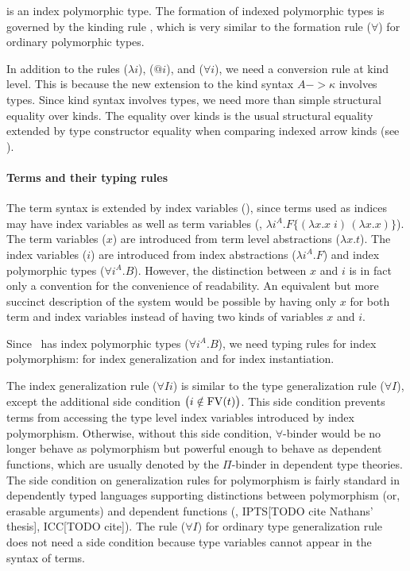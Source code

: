  is an index polymorphic type.
The formation of indexed polymorphic types is governed by
the kinding rule , which is very similar to
the formation rule ($\forall$) for ordinary polymorphic types.

In addition to the rules ($\lambda i$), ($@ i$), and ($\forall i$),
we need a conversion rule  at kind level. This is because
the new extension to the kind syntax $A -> \kappa$ involves types.
Since kind syntax involves types, we need more than simple structural
equality over kinds. The equality over kinds is the usual structural equality
extended by type constructor equality when comparing indexed arrow kinds
(see ).

\paragraph{Terms and their typing rules}
The term syntax is extended by index variables (), since terms used
as indices may have index variables as well as term variables
(\eg, $\lambda i^A.F\{(\lambda x.x\;i)\,(\lambda x.x)\}$).
The term variables ($x$) are introduced from
term level abstractions ($\lambda x.t$).
The index variables ($i$) are introduced from
index abstractions ($\lambda i^A.F$) and
index polymorphic types ($\forall i^A.B$). However, the distinction between
$x$ and $i$ is in fact only a convention for the convenience of readability.
An equivalent but more succinct description of the system would be possible
by having only $x$ for both term and index variables instead of having two
kinds of variables $x$ and $i$.

Since \Fi\ has index polymorphic types ($\forall i^A . B$),
we need typing rules for index polymorphism:
 for index generalization
and  for index instantiation.

The index generalization rule ($\forall I i$) is similar to
the type generalization rule ($\forall I$), except the additional
side condition $\big(i\notin\mathop{\mathrm{FV}}(t)\big)$. This side condition prevents
terms from accessing the type level index variables introduced by index
polymorphism. Otherwise, without this side condition, $\forall$-binder
would be no longer behave as polymorphism but powerful enough to behave as
dependent functions, which are usually denoted by the $\Pi$-binder in
dependent type theories. The side condition on generalization rules
for polymorphism is fairly standard in dependently typed languages supporting
distinctions between polymorphism (or, erasable arguments) and
dependent functions (\eg, IPTS[TODO cite Nathans' thesis], ICC[TODO cite]).
The rule ($\forall I$) for ordinary type generalization rule does not need
a side condition because type variables cannot appear in the syntax of terms.

